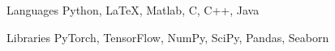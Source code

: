 

\begin{cvskills}

  \cvskill
    {Languages} %
    {Python, \LaTeX, Matlab, C, C++, Java} %

  \cvskill
    {Libraries} %
    {PyTorch, TensorFlow, NumPy, SciPy, Pandas, Seaborn} %



\end{cvskills}
